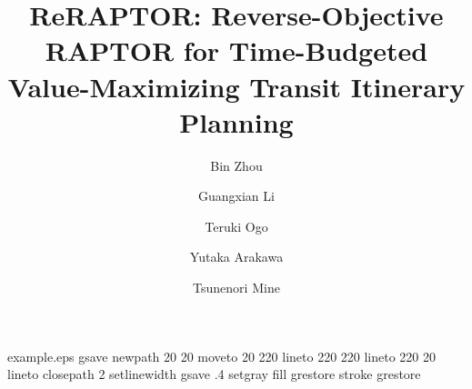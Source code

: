 %
%
%
%
%
\begin{filecontents*}{example.eps}
gsave
newpath
  20 20 moveto
  20 220 lineto
  220 220 lineto
  220 20 lineto
closepath
2 setlinewidth
gsave
  .4 setgray fill
grestore
stroke
grestore
\end{filecontents*}
%
\RequirePackage{fix-cm}
%
\documentclass[twocolumn]{svjour3}         %
%
\smartqed  %
%
%
%
\usepackage{graphicx}
\graphicspath{{../}{./}}
\usepackage{booktabs}
\usepackage{amsmath}
\usepackage{hyperref}
\usepackage{array}
\usepackage{enumitem}
\usepackage{microtype}
\usepackage{xspace}
\usepackage{CJKutf8}

\emergencystretch=1.5em

\newcommand{\algname}{ReRAPTOR\xspace}
%
%
%


\title{ReRAPTOR: Reverse-Objective RAPTOR for Time-Budgeted Value-Maximizing Transit Itinerary Planning}


\author{Bin Zhou \and
    Guangxian Li \and
    Teruki Ogo \and
    Yutaka Arakawa \and
    Tsunenori Mine %
}

